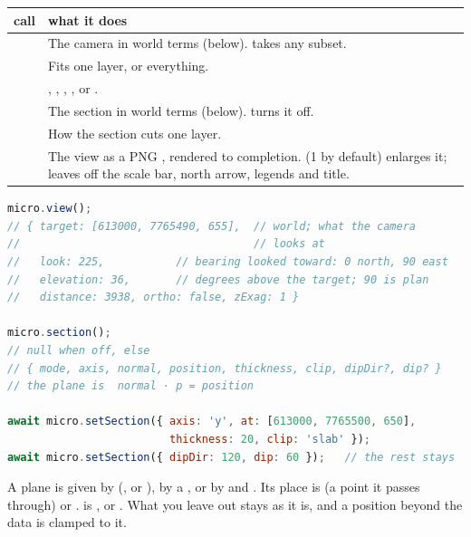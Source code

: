 \begin{tabularx}{\linewidth}{@{}>{\raggedright\arraybackslash}p{44mm}L@{}}
\toprule
call & what it does \\
\midrule
{} \newline {} & The camera in world terms (below).  takes
  any subset. \\
 & Fits one layer, or everything. \\
 & , , , ,  or
  . \\
 \newline {} & The section in world terms (below).
   turns it off. \\
 \newline {} & How the section cuts one layer. \\
 & The view as a PNG , rendered to completion.  (1 by
  default) enlarges it;  leaves off the scale bar, north arrow, legends
  and title. \\
\bottomrule
\end{tabularx}

\begin{lstlisting}[language=js]
micro.view();
// { target: [613000, 7765490, 655],  // world; what the camera
//                                    // looks at
//   look: 225,           // bearing looked toward: 0 north, 90 east
//   elevation: 36,       // degrees above the target; 90 is plan
//   distance: 3938, ortho: false, zExag: 1 }

micro.section();
// null when off, else
// { mode, axis, normal, position, thickness, clip, dipDir?, dip? }
// the plane is  normal · p = position

await micro.setSection({ axis: 'y', at: [613000, 7765500, 650],
                         thickness: 20, clip: 'slab' });
await micro.setSection({ dipDir: 120, dip: 60 });   // the rest stays
\end{lstlisting}

A plane is given by  (,  or ), by a , or by
 and . Its place is  (a point it passes through) or
.  is ,  or . What you leave out
stays as it is, and a position beyond the data is clamped to it.

